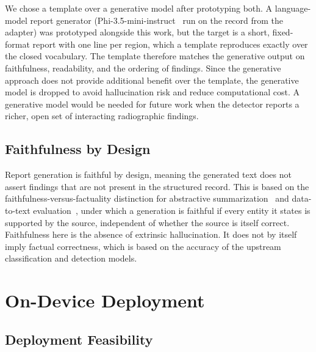 \documentclass[conference, letterpaper]{IEEEtran}
\begin{document}
We chose a template over a generative model after prototyping both. A language-model report generator (Phi-3.5-mini-instruct~\cite{abdin2024phi3} run on the record from the adapter) was prototyped alongside this work, but the target is a short, fixed-format report with one line per region, which a template reproduces exactly over the closed vocabulary. The template therefore matches the generative output on faithfulness, readability, and the ordering of findings. Since the generative approach does not provide additional benefit over the template, the generative model is dropped to avoid hallucination risk and reduce computational cost. A generative model would be needed for future work when the detector reports a richer, open set of interacting radiographic findings.

\subsection{Faithfulness by Design}

Report generation is faithful by design, meaning the generated text does not assert findings that are not present in the structured record. This is based on the faithfulness-versus-factuality distinction for abstractive summarization~\cite{maynez2020faithfulness} and data-to-text evaluation~\cite{dhingra2019parent}, under which a generation is faithful if every entity it states is supported by the source, independent of whether the source is itself correct. Faithfulness here is the absence of extrinsic hallucination. It does not by itself imply factual correctness, which is based on the accuracy of the upstream classification and detection models.

\section{On-Device Deployment}

\subsection{Deployment Feasibility}
\end{document}
